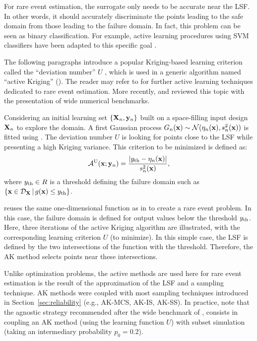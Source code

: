 For rare event estimation, the surrogate only needs to be accurate near the LSF. 
In other words, it should accurately discriminate the points leading to the safe domain from those leading to the failure domain. 
In fact, this problem can be seen as binary classification. 
For example, active learning procedures using SVM classifiers have been adapted to this specific goal \citep{bourinet_2018}. 

The following paragraphs introduce a popular Kriging-based learning criterion called the ``deviation number'' $U$ \citep{echard_2011}, which is used in a generic algorithm named ``active Kriging'' (). 
The reader may refer to \citet{MorioBalesdent2015} for further active learning techniques dedicated to rare event estimation. 
More recently, \citet{teixeira_2021} and \citet{moustapha_ss_2022} reviewed this topic with the presentation of wide numerical benchmarks.

Considering an initial learning set $\left\{{\bf X}_n, {\bf y}_n\right\}$ built on a space-filling input design ${\bf X}_n$ to explore the domain. 
A first Gaussian process $G_n({\bf x}) \sim \mathcal{N}(\eta_n({\bf x}), s_n^2({\bf x}))$ is fitted using . 
The deviation number $U$ is looking for points close to the LSF while presenting a high Kriging variance. 
This criterion to be minimized is defined as:   
\begin{equation}
    \mathcal{A}^{\textrm{U}}({\bf x}; {\bf y}_n) = \frac{\left|y_\mathrm{th} - \eta_n({\bf x})\right|}{s_n^2({\bf x})}, 
    \label{eq:U}
\end{equation}
where $y_\mathrm{th} \in R$ is a threshold defining the failure domain such as $\{{\bf x} \in \mathcal{D}_{\bf X} \, | \, g({\bf x}) \leq y_\mathrm{th}\}$. 

 reuses the same one-dimensional function as in  to create a rare event problem. 
In this case, the failure domain is defined for output values below the threshold $y_\mathrm{th}$. 
Here, three iterations of the active Kriging algorithm are illustrated, with the corresponding learning criterion $U$ (to minimize). 
In this simple case, the LSF is defined by the two intersections of the function with the threshold. 
Therefore, the AK method selects points near these intersections. 


Unlike optimization problems, the active methods are used here for rare event estimation is the result of the approximation of the LSF and a sampling technique. 
AK methods were coupled with most sampling techniques introduced in Section~\ref{sec:reliability} (e.g., AK-MCS, AK-IS, AK-SS). 
In practice, note that the agnostic strategy recommended after the wide benchmark of \citet{moustapha_ss_2022}, consists in coupling an AK method (using the learning function $U$) with subset simulation (taking an intermediary probability $p_0 =0.2$). 

